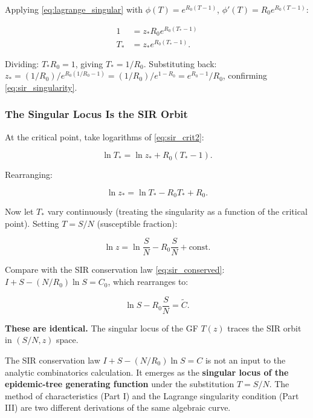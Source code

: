 \documentclass[11pt,a4paper]{article}
\theoremstyle{definition}
\begin{document}
Applying \eqref{eq:lagrange_singular} with $\phi(T) = e^{R_0(T-1)}$,
$\phi'(T) = R_0 e^{R_0(T-1)}$:

\begin{align}
  1 &= z_* R_0 e^{R_0(T_*-1)} \label{eq:sir_crit1}\\
  T_* &= z_* e^{R_0(T_*-1)}. \label{eq:sir_crit2}
\end{align}

Dividing: $T_* R_0 = 1$, giving $T_* = 1/R_0$. Substituting back:
$z_* = (1/R_0)/e^{R_0(1/R_0 - 1)} = (1/R_0)/e^{1-R_0} = e^{R_0-1}/R_0$, confirming
\eqref{eq:sir_singularity}.

\subsubsection{The Singular Locus Is the SIR Orbit}

At the critical point, take logarithms of \eqref{eq:sir_crit2}:

\[
  \ln T_* = \ln z_* + R_0(T_* - 1).
\]

Rearranging:

\begin{equation}
  \ln z_* = \ln T_* - R_0 T_* + R_0.
  \label{eq:singular_locus}
\end{equation}

Now let $T_*$ vary continuously (treating the singularity as a function of
the critical point). Setting $T = S/N$ (susceptible fraction):

\begin{equation}
  \ln z = \ln\frac{S}{N} - R_0\frac{S}{N} + \text{const}.
  \label{eq:singular_locus_S}
\end{equation}

Compare with the SIR conservation law \eqref{eq:sir_conserved}: $I + S - (N/R_0)\ln S = C_0$,
which rearranges to:

\begin{equation}
  \ln S - R_0\frac{S}{N} = \tilde{C}.
\end{equation}

\textbf{These are identical.} The singular locus of the GF $T(z)$ traces the
SIR orbit in $(S/N, z)$ space.

\begin{keybox}
The SIR conservation law $I + S - (N/R_0)\ln S = C$ is not an input to the
analytic combinatorics calculation. It emerges as the \textbf{singular locus
of the epidemic-tree generating function} under the substitution $T = S/N$.
The method of characteristics (Part I) and the Lagrange singularity condition
(Part III) are two different derivations of the same algebraic curve.
\end{keybox}
\end{document}
